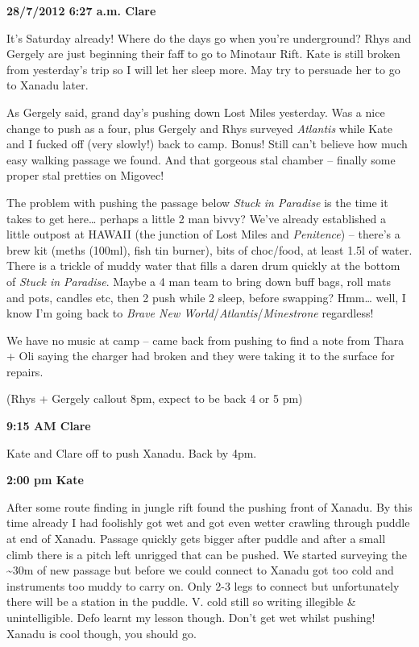 \textbf{28/7/2012 6:27 a.m. Clare}

It's Saturday already! Where do the days go when you're underground?
Rhys and Gergely are just beginning their faff to go to Minotaur Rift.
Kate is still broken from yesterday's trip so I will let her sleep more.
May try to persuade her to go to Xanadu later.

As Gergely said, grand day's pushing down Lost Miles yesterday. Was a
nice change to push as a four, plus Gergely and Rhys surveyed
\emph{Atlantis} while Kate and I fucked off (very slowly!) back to camp.
Bonus! Still can't believe how much easy walking passage we found. And
that gorgeous stal chamber -- finally some proper stal pretties on
Migovec!

The problem with pushing the passage below \emph{Stuck in Paradise} is
the time it takes to get here\ldots{} perhaps a little 2 man bivvy?
We've already established a little outpost at HAWAII (the junction of
Lost Miles and \emph{Penitence}) -- there's a brew kit (meths (100ml),
fish tin burner), bits of choc/food, at least 1.5l of water. There is a
trickle of muddy water that fills a daren drum quickly at the bottom of
\emph{Stuck in Paradise}. Maybe a 4 man team to bring down buff bags,
roll mats and pots, candles etc, then 2 push while 2 sleep, before
swapping? Hmm\ldots{} well, I know I'm going back to \emph{Brave New
World}/\emph{Atlantis}/\emph{Minestrone} regardless!

We have no music at camp -- came back from pushing to find a note from
Thara + Oli saying the charger had broken and they were taking it to the
surface for repairs.

(Rhys + Gergely callout 8pm, expect to be back 4 or 5 pm)

\textbf{9:15 AM Clare}

Kate and Clare off to push Xanadu. Back by 4pm.

\textbf{2:00 pm Kate}

After some route finding in jungle rift found the pushing front of
Xanadu. By this time already I had foolishly got wet and got even wetter
crawling through puddle at end of Xanadu. Passage quickly gets bigger
after puddle and after a small climb there is a pitch left unrigged that
can be pushed. We started surveying the \textasciitilde{}30m of new
passage but before we could connect to Xanadu got too cold and
instruments too muddy to carry on. Only 2-3 legs to connect but
unfortunately there will be a station in the puddle. V. cold still so
writing illegible \& unintelligible. Defo learnt my lesson though. Don't
get wet whilst pushing! Xanadu is cool though, you should go.

